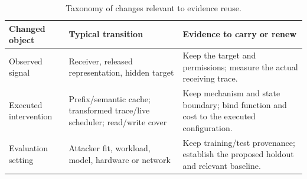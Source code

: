 \begin{table}[t]\centering\footnotesize
\caption{Taxonomy of changes relevant to evidence reuse.}\label{tab:r33-taxonomy}
\begin{tabularx}{\columnwidth}{@{}p{}YY@{}}\toprule
Changed object & Typical transition & Evidence to carry or renew\\\midrule
Observed signal & Receiver, released representation, hidden target & Keep the target and permissions; measure the actual receiving trace.\\
Executed intervention & Prefix/semantic cache; transformed trace/live scheduler; read/write cover & Keep mechanism and state boundary; bind function and cost to the executed configuration.\\
Evaluation setting & Attacker fit, workload, model, hardware or network & Keep training/test provenance; establish the proposed holdout and relevant baseline.\\
\bottomrule\end{tabularx}\end{table}
